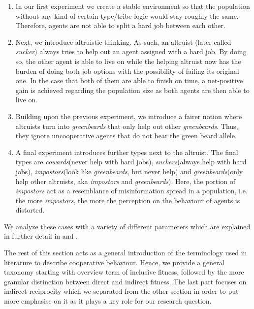 \documentclass[sigconf]{acmart}
\newcommand{\todo}[1]{{\color{red}{#1}}}
\newcommand{\cowards}{\textit{cowards}\xspace}
\newcommand{\suckers}{\textit{suckers}\xspace}
\newcommand{\sucker}{\textit{sucker}\xspace}
\newcommand{\impostors}{\textit{impostors}\xspace}
\newcommand{\greenbeards}{\textit{greenbeards}\xspace}
\begin{document}
    \begin{enumerate}
        \item In our first experiment we create a stable environment so that the population without any kind of certain type/tribe logic would stay roughly the same. Therefore, agents are not able to split a hard job between each other.

        \item Next, we introduce altruistic thinking.
        As such, an altruist (later called \sucker) always tries to help out an agent assigned with a hard job.
        By doing so, the other agent is able to live on while the helping altruist now has the burden of doing both job options with the possibility of failing its original one.
        In the case that both of them are able to finish on time, a net-positive gain is achieved regarding the population size as both agents are then able to live on.

        \item Building upon the previous experiment, we introduce a fairer notion where altruists turn into \greenbeards that only help out other \greenbeards.
        Thus, they ignore uncooperative agents that do not bear the green beard allele.

        \item A final experiment introduces further types next to the altruist.
        The final types are \cowards (never help with hard jobs), \suckers (always help with hard jobs), \impostors (look like \greenbeards, but never help) and  \greenbeards (only help other altruists, aka \impostors and \greenbeards).
        Here, the portion of \impostors act as a resemblance of misinformation spread in a population, i.e. the more \impostors, the more the perception on the behaviour of agents is distorted.

    \end{enumerate}

    We analyze these cases with a variety of different parameters which are explained in further detail in  and .

    \todo{Mention central results and key insight briefly.}

    The rest of this section acts as a general introduction of the terminology used in literature to describe cooperative behaviour.
    Hence, we provide a general taxonomy starting with overview term of inclusive fitness, followed by the more granular distinction between direct and indirect fitness.
    The last part focuses on indirect reciprocity which we separated from the other section in order to put more emphasise on it as it plays a key role for our research question.
\end{document}
